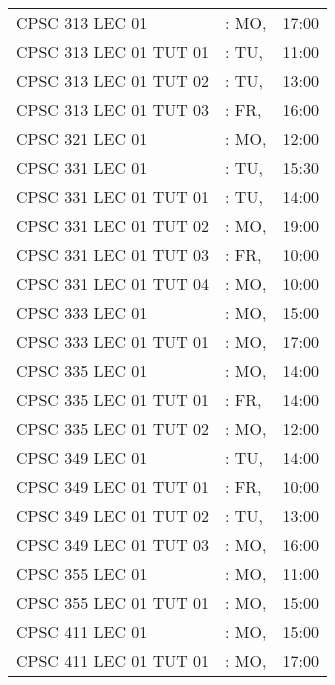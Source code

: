\documentclass[11pt]{article}
\begin{document}
\begin{longtable}{l l r}
CPSC 313 LEC 01               &\hspace*{1.5cm}: MO,& 17:00\tabularnewline
CPSC 313 LEC 01 TUT 01        &\hspace*{1.5cm}: TU,& 11:00\tabularnewline
CPSC 313 LEC 01 TUT 02        &\hspace*{1.5cm}: TU,& 13:00\tabularnewline
CPSC 313 LEC 01 TUT 03        &\hspace*{1.5cm}: FR,& 16:00\tabularnewline
CPSC 321 LEC 01               &\hspace*{1.5cm}: MO,& 12:00\tabularnewline
CPSC 331 LEC 01               &\hspace*{1.5cm}: TU,& 15:30\tabularnewline
CPSC 331 LEC 01 TUT 01        &\hspace*{1.5cm}: TU,& 14:00\tabularnewline
CPSC 331 LEC 01 TUT 02        &\hspace*{1.5cm}: MO,& 19:00\tabularnewline
CPSC 331 LEC 01 TUT 03        &\hspace*{1.5cm}: FR,& 10:00\tabularnewline
CPSC 331 LEC 01 TUT 04        &\hspace*{1.5cm}: MO,& 10:00\tabularnewline
CPSC 333 LEC 01               &\hspace*{1.5cm}: MO,& 15:00\tabularnewline
CPSC 333 LEC 01 TUT 01        &\hspace*{1.5cm}: MO,& 17:00\tabularnewline
CPSC 335 LEC 01               &\hspace*{1.5cm}: MO,& 14:00\tabularnewline
CPSC 335 LEC 01 TUT 01        &\hspace*{1.5cm}: FR,& 14:00\tabularnewline
CPSC 335 LEC 01 TUT 02        &\hspace*{1.5cm}: MO,& 12:00\tabularnewline
CPSC 349 LEC 01               &\hspace*{1.5cm}: TU,& 14:00\tabularnewline
CPSC 349 LEC 01 TUT 01        &\hspace*{1.5cm}: FR,& 10:00\tabularnewline
CPSC 349 LEC 01 TUT 02        &\hspace*{1.5cm}: TU,& 13:00\tabularnewline
CPSC 349 LEC 01 TUT 03        &\hspace*{1.5cm}: MO,& 16:00\tabularnewline
CPSC 355 LEC 01               &\hspace*{1.5cm}: MO,& 11:00\tabularnewline
CPSC 355 LEC 01 TUT 01        &\hspace*{1.5cm}: MO,& 15:00\tabularnewline
CPSC 411 LEC 01               &\hspace*{1.5cm}: MO,& 15:00\tabularnewline
CPSC 411 LEC 01 TUT 01        &\hspace*{1.5cm}: MO,& 17:00\tabularnewline

\end{longtable}
\end{document}

